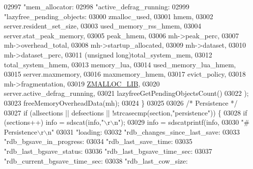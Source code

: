 \begin{DoxyCode}
{{{{{{{{{{{{{{{{{{{{{{{{{{{{{{{{{{{{{{{{{{{{{{{{{{{{{{{{{{{{{{{{{{{{{{{{{{{{{{{{{{{02997             \textcolor{stringliteral}{"mem\_allocator:%
02998             \textcolor{stringliteral}{"active\_defrag\_running:%
02999             \textcolor{stringliteral}{"lazyfree\_pending\_objects:%
03000             zmalloc\_used,
03001             hmem,
03002             server.resident\_set\_size,
03003             used\_memory\_rss\_hmem,
03004             server.stat\_peak\_memory,
03005             peak\_hmem,
03006             mh->peak\_perc,
03007             mh->overhead\_total,
03008             mh->startup\_allocated,
03009             mh->dataset,
03010             mh->dataset\_perc,
03011             (\textcolor{keywordtype}{unsigned} \textcolor{keywordtype}{long})total\_system\_mem,
03012             total\_system\_hmem,
03013             memory\_lua,
03014             used\_memory\_lua\_hmem,
03015             server.maxmemory,
03016             maxmemory\_hmem,
03017             evict\_policy,
03018             mh->fragmentation,
03019             \hyperlink{zmalloc_8h_a374c6d7cf6c9817e1243093e03df7319}{ZMALLOC\_LIB},
03020             server.active\_defrag\_running,
03021             lazyfreeGetPendingObjectsCount()
03022         );
03023         freeMemoryOverheadData(mh);
03024     \}
03025 
03026     \textcolor{comment}{/* Persistence */}
03027     \textcolor{keywordflow}{if} (allsections || defsections || !strcasecmp(section,\textcolor{stringliteral}{"persistence"})) \{
03028         \textcolor{keywordflow}{if} (sections++) info = sdscat(info,\textcolor{stringliteral}{"\(\backslash\)r\(\backslash\)n"});
03029         info = sdscatprintf(info,
03030             \textcolor{stringliteral}{"# Persistence\(\backslash\)r\(\backslash\)n"}
03031             \textcolor{stringliteral}{"loading:%
03032             \textcolor{stringliteral}{"rdb\_changes\_since\_last\_save:%
03033             \textcolor{stringliteral}{"rdb\_bgsave\_in\_progress:%
03034             \textcolor{stringliteral}{"rdb\_last\_save\_time:%
03035             \textcolor{stringliteral}{"rdb\_last\_bgsave\_status:%
03036             \textcolor{stringliteral}{"rdb\_last\_bgsave\_time\_sec:%
03037             \textcolor{stringliteral}{"rdb\_current\_bgsave\_time\_sec:%
03038             \textcolor{stringliteral}{"rdb\_last\_cow\_size:%
}}}}}}}}}}}}}}}}}}}}}}}}}}}}}}}}}}}}}}}}}}}}}}}}}}}}}}}}}}}}}}}}}}}}}}}}}}}}}}}}}}}}}}}}}}}}}}
\end{DoxyCode}
